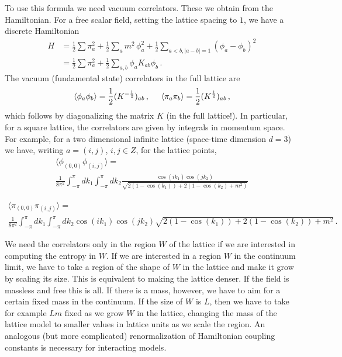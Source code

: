 \documentclass[11pt]{article}
\numberwithin{equation}{section}
\begin{document}
To use this formula we need vacuum correlators. These we obtain from the Hamiltonian. For a free scalar field, setting the lattice spacing to $1$, we have a discrete Hamiltonian
\begin{align}
H &=\frac{1}{2}\sum \pi _{a}^{2}+\frac{1}{2}\sum_{a}m^2\, \phi_a^2+\frac{1}{2}\sum_{a<b, |a-b|=1}    (\phi_a -\phi_{b})^2 \nonumber\\
& =\frac{1}{2}\sum \pi _{a}^{2}+\frac{1}{2}\sum_{a,b}\phi _{a}K_{ab}\phi
_{b}\,.
\end{align}
The vacuum (fundamental state) correlators in the full lattice are 
\begin{equation}
\left\langle \phi _{a}\phi _{b}\right\rangle =\frac{1}{2}(K^{-
\frac{1}{2}})_{ab}\,, \hspace{.5cm}
\left\langle \pi _{a}\pi _{b}\right\rangle =\frac{1}{2}(K^{\frac{1
}{2}})_{ab}\,, \label{p}
\end{equation}
which follows by diagonalizing the matrix $K$ (in the full lattice!). In particular, for a square lattice, the correlators are given by integrals in momentum space. For example, for a two dimensional infinite lattice (space-time dimension $d=3$) we have, writing $a=(i,j)$, $i,j \in Z$, for the lattice points,  
\begin{multline}
\langle \phi_{(0,0)}\phi_{(i,j)}\rangle = \\ 
\frac{1}{8\pi^2}\int_{-\pi}^{\pi}dk_1 \int_{-\pi}^{\pi}dk_2\frac{\cos(i k_1)\cos(j k_2)}{\sqrt{2
(1-\cos(k_1))+2
(1-\cos(k_2)+m^2)}}
\end{multline}

\begin{multline}
\langle \pi_{(0,0)}\pi_{(i,j)}\rangle =\\ 
\frac{1}{8\pi^2}\int_{-\pi}^{\pi} dk_1\int_{-\pi}^{\pi}dk_2 \cos(i k_1)\cos(j k_2){\sqrt{2
(1-\cos(k_1))+2
(1-\cos(k_2))+m^2}}\,.
\end{multline}


We need the correlators only in the region $W$ of the lattice if we are interested in computing the entropy in $W$. If we are interested in a region $W$ in the continuum limit, we have to take a region of the shape of $W$ in the lattice and make it grow by scaling its size. This is equivalent to making the lattice denser. If the field is massless and free this is all. If there is a mass, however, we have to aim for a certain fixed mass in the continuum. If the size of $W$ is $L$, then we have to take for example $L m$ fixed as we grow $W$ in the lattice, changing the mass of the lattice model to smaller values in lattice units as we scale the region. An analogous (but more complicated) renormalization of Hamiltonian coupling constants is necessary for interacting models.    
\end{document}
